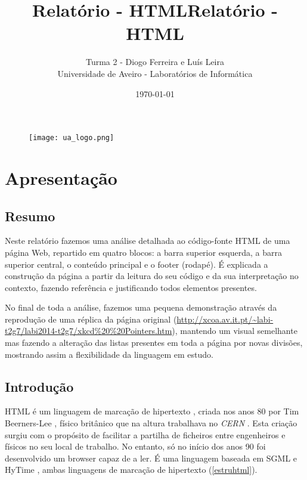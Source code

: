\documentclass[11pt,openright,twoside]{report}
\title{\textbf{Relatório - HTML}}
\begin{document}
\begin{titlepage}
\begin{figure}
\title{\textbf{Relatório - HTML}}
\author{Turma 2 - Diogo Ferreira e Luís Leira\\\vspace{3cm}
Universidade de Aveiro - Laboratórios de Informática}
\date{\today}
 \texttt{[image: ua\_logo.png]}
\end{figure}
\end{titlepage}

\maketitle
\tableofcontents
\listoffigures

\part{Apresentação}

\chapter{Resumo}
Neste relatório fazemos uma análise detalhada ao código-fonte HTML de uma página Web, repartido em quatro blocos: a barra superior esquerda, a barra superior central, o conteúdo principal e o footer (rodapé). É explicada a construção da página a partir da leitura do seu código e da sua interpretação no contexto, fazendo referência e justificando todos elementos presentes.
\smallskip

No final de toda a análise, fazemos uma pequena demonstração através da reprodução de uma réplica da página original (\url{http://xcoa.av.it.pt/~labi-t2g7/labi2014-t2g7/xkcd\%20\%20Pointers.htm}), mantendo um visual semelhante mas fazendo a alteração das listas presentes em toda a página por novas divisões, mostrando assim a flexibilidade da linguagem em estudo.
\smallskip

\chapter{Introdução}
HTML é um linguagem de marcação de hipertexto \cite{markup}, criada nos anos 80 por Tim Beerners-Lee \cite{HTML}, físico britânico que na altura trabalhava no \textit{CERN} \cite{CERN}. Esta criação surgiu com o propósito de facilitar a partilha de ficheiros entre engenheiros e físicos no seu local de trabalho. No entanto, só no início dos anos 90 foi desenvolvido um browser capaz de a ler. É uma linguagem baseada em SGML \cite{SGML} e HyTime \cite{HyTime}, ambas linguagens de marcação de hipertexto (\autoref{estruhtml}).
\smallskip
\end{document}
